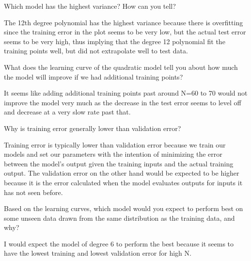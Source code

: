 \begin{problem}[3]
  Which model has the highest variance? How can you tell?
\end{problem}
\begin{solution}
  The 12th degree polynomial has the highest variance because there is overfitting since the training error in the plot seems to be very low, but the actual test error seems to be very high, thus implying that the degree 12 polynomial fit the training points well, but did not extrapolate well to test data.
\end{solution}

\begin{problem}[3]
  What does the learning curve of the quadratic model tell you about how much the model will improve if we had additional training points?
\end{problem}
\begin{solution}
  It seems like adding additional training points past around N=60 to 70 would not improve the model very much as the decrease in the test error seems to level off and decrease at a very slow rate past that.
\end{solution}

\begin{problem}[3]
  Why is training error generally lower than validation error?
\end{problem}
\begin{solution}
  Training error is typically lower than validation error because we train our models and set our parameters with the intention of minimizing the error between the model's output given the training inputs and the actual training output. The validation error on the other hand would be expected to be higher because it is the error calculated when the model evaluates outputs for inputs it has not seen before.
\end{solution}

\begin{problem}[3]
  Based on the learning curves, which model would you expect to perform best on some unseen data drawn from the same distribution as the training data, and why?
\end{problem}
\begin{solution}
  I would expect the model of degree 6 to perform the best because it seems to have the lowest training and lowest validation error for high N.
\end{solution}





